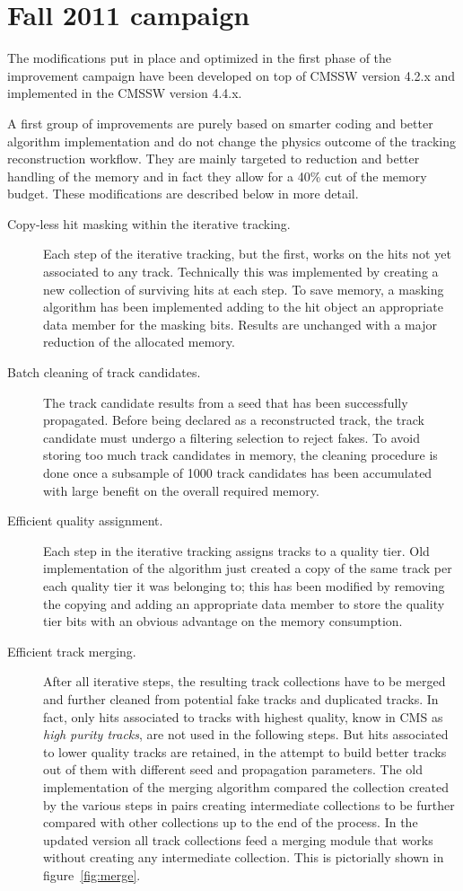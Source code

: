 \section{Fall 2011 campaign}
\label{fall11}

The modifications put in place and optimized in the first phase of the
improvement campaign have been developed on top of CMSSW version 4.2.x
and implemented in the CMSSW version 4.4.x. 

A first group of improvements are purely based on smarter coding
and better algorithm implementation and do not
change the physics outcome of the tracking reconstruction
workflow. They are mainly targeted to reduction and better handling of
the memory and in fact they allow for a 40\% cut of the
memory budget. These modifications are described below in more detail.
\begin{description}
\item[Copy-less hit masking within the iterative tracking.] Each
  step of the iterative tracking, but the first, works on the hits not
  yet associated to any track. Technically this was implemented by
  creating a new collection of surviving hits at each step. To save
  memory, a masking algorithm has been implemented adding to the hit
  object an appropriate data member for the masking bits. Results are
  unchanged with a major reduction of the allocated memory.
\item[Batch cleaning of track candidates.] The track candidate results
  from a seed that has been successfully propagated. Before being
  declared as a reconstructed track, the track candidate must undergo
  a filtering selection to reject fakes. To
  avoid storing too much track candidates in memory, the
  cleaning procedure is done once a subsample of 1000 track candidates
  has been accumulated with large benefit on the overall required memory.
\item[Efficient quality assignment.] Each step in
  the iterative tracking assigns tracks to a quality tier. Old
  implementation of the algorithm just created a copy of the same
  track per each quality tier it was belonging to; this has been
  modified by removing the copying and adding an appropriate data
  member to store the quality tier bits with an obvious advantage on
  the memory consumption.
\item[Efficient track merging.] After all iterative steps, the
  resulting track collections have to be merged and further cleaned from
  potential fake tracks and duplicated tracks. In fact, only hits
  associated to tracks with highest quality, know in CMS as {\em high 
    purity tracks}, are not used in the following steps. But hits
  associated to lower quality tracks are retained, in the attempt to
  build better tracks out of them with different seed and propagation
  parameters. The old implementation of the merging algorithm compared the
  collection created by the various steps in pairs creating intermediate
  collections to be further compared with other collections up to the
  end of the process. In the updated version all track collections
  feed a merging module that works without creating any intermediate
  collection. This is pictorially shown in figure~\ref{fig:merge}.
\end{description}

